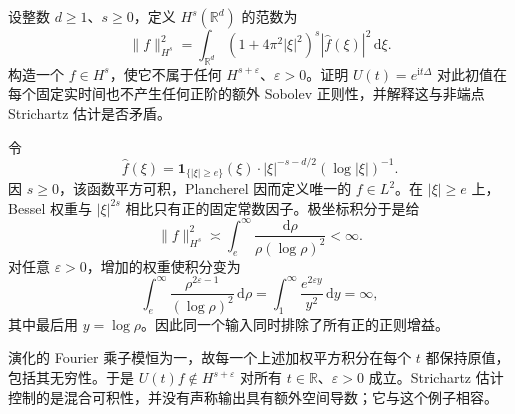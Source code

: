 \begin{exercise}\label{b2:ex:app-E-6}
设整数 \(d\geq1\)、\(s\geq0\)，定义 \(H^s(\mathbb R^d)\) 的范数为
\[
 \|f\|_{H^s}^2=\int_{\mathbb R^d}
       (1+4\pi^2|\xi|^2)^s|\widehat f(\xi)|^2\,\mathrm d\xi.
\]
构造一个 \(f\in H^s\)，使它不属于任何 \(H^{s+\varepsilon}\)、\(\varepsilon>0\)。证明 \(U(t)=e^{\mathrm it\Delta}\) 对此初值在每个固定实时间也不产生任何正阶的额外 Sobolev 正则性，并解释这与非端点 Strichartz 估计是否矛盾。
\end{exercise}
\begin{solution}
令
\[
 \widehat f(\xi)=\mathbf1_{\{|\xi|\geq e\}}(\xi)
       \cdot|\xi|^{-s-d/2}(\log|\xi|)^{-1}.
\]
因 \(s\geq0\)，该函数平方可积，Plancherel 因而定义唯一的 \(f\in L^2\)。在 \(|\xi|\geq e\) 上，Bessel 权重与 \(|\xi|^{2s}\) 相比只有正的固定常数因子。极坐标积分于是给
\[
 \|f\|_{H^s}^2\asymp\int_e^\infty\frac{\mathrm d\rho}{\rho(\log\rho)^2}<\infty.
\]
对任意 \(\varepsilon>0\)，增加的权重使积分变为
\[
 \int_e^\infty\frac{\rho^{2\varepsilon-1}}{(\log\rho)^2}\,\mathrm d\rho
 =\int_1^\infty\frac{e^{2\varepsilon y}}{y^2}\,\mathrm dy=\infty,
\]
其中最后用 \(y=\log\rho\)。因此同一个输入同时排除了所有正的正则增益。

演化的 Fourier 乘子模恒为一，故每一个上述加权平方积分在每个 \(t\) 都保持原值，包括其无穷性。于是 \(U(t)f\notin H^{s+\varepsilon}\) 对所有 \(t\in\mathbb R\)、\(\varepsilon>0\) 成立。Strichartz 估计控制的是混合可积性，并没有声称输出具有额外空间导数；它与这个例子相容。
\end{solution}

